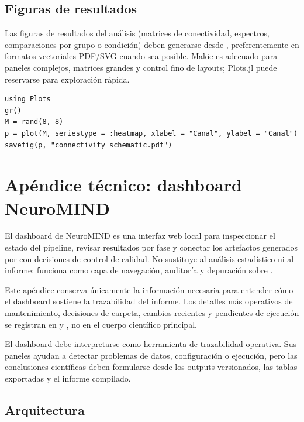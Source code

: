 \subsection{Figuras de resultados}

Las figuras de resultados del análisis (matrices de conectividad, espectros, comparaciones por grupo o condición) deben generarse desde \Julia{}, preferentemente en formatos vectoriales PDF/SVG cuando sea posible. Makie es adecuado para paneles complejos, matrices grandes y control fino de layouts; Plots.jl puede reservarse para exploración rápida.

\begin{lstlisting}[caption={Ejemplo mínimo de exportación de una matriz tipo conectividad en Julia.}]
using Plots
gr()
M = rand(8, 8)
p = plot(M, seriestype = :heatmap, xlabel = "Canal", ylabel = "Canal")
savefig(p, "connectivity_schematic.pdf")
\end{lstlisting}

\section{Apéndice técnico: dashboard NeuroMIND}

El dashboard de NeuroMIND es una interfaz web local para inspeccionar el estado del pipeline, revisar resultados por fase y conectar los artefactos generados por \Julia{} con decisiones de control de calidad. No sustituye al análisis estadístico ni al informe: funciona como capa de navegación, auditoría y depuración sobre .

\begin{controlqc}
\small
Este apéndice conserva únicamente la información necesaria para entender cómo el dashboard sostiene la trazabilidad del informe. Los detalles más operativos de mantenimiento, decisiones de carpeta, cambios recientes y pendientes de ejecución se registran en  y , no en el cuerpo científico principal.
\end{controlqc}

\begin{decisionmetodologica}
El dashboard debe interpretarse como herramienta de trazabilidad operativa. Sus paneles ayudan a detectar problemas de datos, configuración o ejecución, pero las conclusiones científicas deben formularse desde los outputs versionados, las tablas exportadas y el informe compilado.
\end{decisionmetodologica}

\subsection{Arquitectura}

